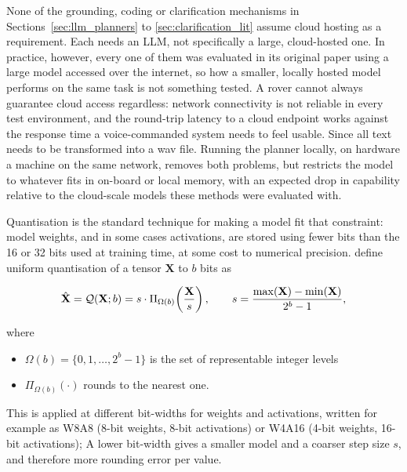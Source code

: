 \label{sec:local_models}

None of the grounding, coding or clarification mechanisms in Sections~\ref{sec:llm_planners} to
\ref{sec:clarification_lit} assume cloud hosting as a requirement. Each needs an LLM, not
specifically a large, cloud-hosted one. In practice, however, every one of them was evaluated in
its original paper using a large model accessed over the internet, so how a smaller, locally
hosted model performs on the same task is not something tested.
A rover cannot always guarantee cloud access regardless: network connectivity is not reliable in
every test environment, and the round-trip latency to a cloud endpoint works against the response
time a voice-commanded system needs to feel usable. Since all text needs to be transformed into a 
wav file.  Running the planner locally, on hardware a machine on the same network, removes both problems, but restricts the
model to whatever fits in on-board or local memory, with an expected drop in capability relative
to the cloud-scale models these methods were evaluated with.

Quantisation is the standard technique for making a model fit that constraint: model weights, and in some cases activations, are stored using fewer bits than the 16 or 32 bits used at training time, 
at some cost to numerical precision. \citet{liu2025quantreasoning} define uniform quantisation of a tensor $\mathbf{X}$ to $b$ bits as

\begin{equation}
    \hat{\mathbf{X}} = \mathcal{Q}(\mathbf{X}; b) = s \cdot \Pi_{\Omega(b)}\mskip-\thinmuskip\left(\frac{\mathbf{X}}{s}\right), \qquad s = \frac{\max(\mathbf{X}) - \min(\mathbf{X})}{2^{b}-1},
    \label{eq:quantization}
\end{equation}

where 
\begin{itemize}[font=\bfseries]
    \item $\Omega(b) = \{0, 1, \dots, 2^{b}-1\}$ is the set of representable integer levels
    \item $\Pi_{\Omega(b)}(\cdot)$ rounds to the nearest one.
\end{itemize}

This is applied at different bit-widths for weights and activations, written for example as W8A8 (8-bit weights, 8-bit activations) or W4A16 (4-bit weights, 16-bit activations); A lower bit-width gives a smaller model and a coarser step size $s$, and therefore more rounding error per value.

